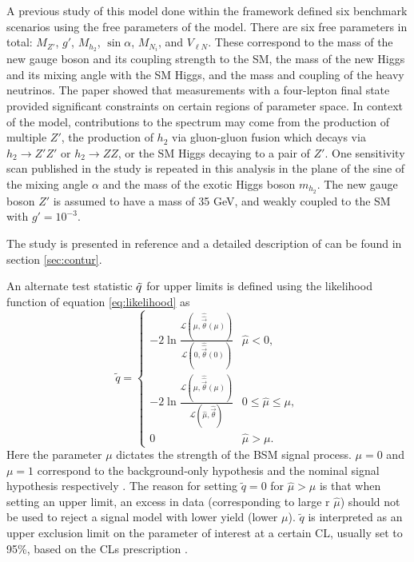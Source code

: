 A previous study of this model done within the \Contur framework defined six benchmark scenarios using the free parameters of the model. There are six free parameters in total: $M_{Z'}$, $g'$, $M_{h_2}$, $\sin \alpha$, $M_{N_i}$, and $V_{\ell N}$. These correspond to the mass of the new gauge boson and its coupling strength to the SM, the mass of the new Higgs and its mixing angle with the SM Higgs, and the mass  and coupling of the heavy neutrinos. The paper showed that \ATLAS measurements with a four-lepton final state provided significant constraints on certain regions of parameter space. In context of the model, contributions to the spectrum may come from the production of multiple $Z'$, the production of $h_2$ via gluon-gluon fusion which decays via $h_2\rightarrow Z'Z'$ or $h_2\rightarrow ZZ$, or the SM Higgs decaying to a pair of $Z'$. One sensitivity scan published in the study is repeated in this analysis in the plane of the sine of the mixing angle $\alpha$ and the mass of the exotic Higgs boson $m_{h_{\text{2}}}$. The new gauge boson $Z'$ is assumed to have a mass of 35 GeV, and weakly coupled to the SM with $g'=10^{-3}$. 


The study is presented in reference \cite{} and a detailed description of \Contur can be found in section \ref{sec:contur}. 

An alternate test statistic $\Tilde{q}$ for upper limits is defined using the likelihood function of equation \ref{eq:likelihood} as
\begin{equation}
    \tilde{q} = 
    \begin{cases}
        - 2 \ln \frac{\mathcal{L}( {\mu}, \hat{\hat{\vec{\theta}}}({\mu})) } {\mathcal{L}(0,         \hat{\hat{\vec{\theta}}}(0) )} & \hat\mu < 0, \\ 
        - 2 \ln \frac{\mathcal{L}( {\mu}, \hat{\hat{\vec{\theta}}}({\mu})) } {\mathcal{L}(\hat{\mu}, \hat{\vec{\theta}} )} & 0 \leq \hat\mu \leq \mu,  \\ 
        0 & \hat\mu > \mu.
    \end{cases}
    \label{eq:lambda_qtilde}
\end{equation}
Here the parameter $\mu$ dictates the strength of the BSM signal process. $\mu = 0$ and $\mu = 1$ correspond to the background-only hypothesis and the nominal signal hypothesis respectively \cite{m4l2021_paper}. The reason for setting $\tilde{q} = 0$ for $\hat{\mu} > \mu$ is that when setting an upper limit, an excess in data (corresponding to large r $\hat{\mu}$) should not be used to reject a signal model with lower yield (lower $\mu$). $\tilde{q}$ is interpreted as an upper
exclusion limit on the parameter of interest at a certain CL, usually set to 95\%, based on the CLs prescription \cite{CLs_technique} . 

